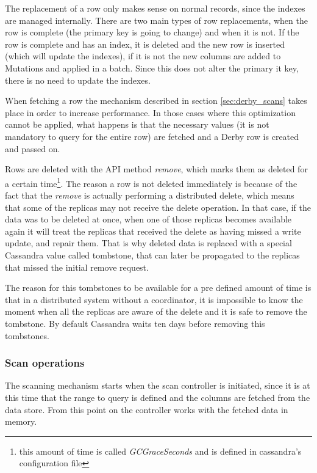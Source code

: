 The replacement of a row only makes sense on normal records, since the indexes are managed internally. There are two main types of row replacements, when the row is complete (the primary key is going to change) and when it is not. If the row is complete and has an index, it is deleted and the new row is inserted (which will update the indexes), if it is not the new columns are added to Mutations and applied in a batch. Since this does not alter the primary it key, there is no need to update the indexes.

When fetching a row the mechanism described in section \ref{sec:derby_scans} takes place in order to increase performance. In those cases where this optimization cannot be applied, what happens is that the necessary values (it is not mandatory to query for the entire row) are fetched and a Derby row is created and passed on.  

Rows are deleted with the API method \emph{remove}, which marks them as deleted for a certain time\footnote{this amount of time is called \emph{GCGraceSeconds} and is defined in cassandra's configuration file}. The reason a row is not deleted immediately is because of the fact that the \emph{remove} is actually performing a distributed delete, which means that some of the replicas may not receive the delete operation. In that case, if the data was to be deleted at once, when one of those replicas becomes available again it will treat the replicas that received the delete as having missed a write update, and repair them. That is why deleted data is replaced with a special Cassandra value called tombstone, that can later be propagated to the replicas that missed the initial remove request.

The reason for this tombstones to be available for a pre defined amount of time is that in a distributed system without a coordinator, it is impossible to know the moment when all the replicas are aware of the delete and it is safe to remove the tombstone. By default Cassandra waits ten days before removing this tombstones.

\subsubsection{Scan operations}
The scanning mechanism starts when the scan controller is initiated, since it is at this time that the range to query is defined and the columns are fetched from the data store. From this point on the controller works with the fetched data in memory.

